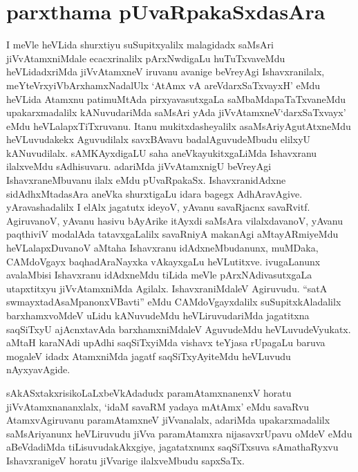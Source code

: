 \section*{parxthama pUvaRpakaSxdasAra}

\begin{artha}
I meVle heVLida shurxtiyu suSupitxyalilx malagidadx saMsAri
jiVvAtamxniMdale  ecacxrinalilx pArxNwdigaLu huTuTxvaveMdu
heVLidadxriMda jiVvAtamxneV iruvanu avanige beVreyAgi Ishavxranilalx,
meYteVrxyiVbArxhamxNadalUlx `AtAmx vA areVdarxSaTxvayxH' eMdu heVLida
Atamxnu patimuMtAda pirxyavasutxgaLa saMbaMdapaTaTxvaneMdu
upakarxmadalilx kANuvudariMda saMsAri yAda jiVvAtamxneV`darxSaTxvayx'
eMdu heVLalapxTiTxruvanu. Itanu mukitxdasheyalilx
asaMsAriyAgutAtxneMdu heVLuvudakekx Aguvudilalx  savxBAvavu
badalAguvudeMbudu elilxyU kANuvudilalx. sAMKAyxdigaLU saha
aneVkayukitxgaLiMda Ishavxranu ilalxveMdu sAdhisuvaru. adariMda
jiVvAtamxnigU beVreyAgi IshavxraneMbuvanu ilalx eMdu
pUvaRpakaSx. IshavxranidAdxne sidAdhxMtadasAra aneVka shurxtigaLu
idara bagegx  AdhAravAgive. yAravashadalilx I elAlx jagatutx ideyoV,
yAvanu savaRjacnx savaRvitf. AgiruvanoV, yAvanu hasivu  bAyArike
itAyxdi saMsAra vilalxdavanoV, yAvanu paqthiviV modalAda
tatavxgaLalilx savaRniyA makanAgi aMtayARmiyeMdu heVLalapxDuvanoV
aMtaha Ishavxranu idAdxneMbudanunx, muMDaka, CAMdoVgayx baqhadAraNayxka
vAkayxgaLu heVLutitxve. ivugaLanunx avalaMbisi Ishavxranu idAdxneMdu
tiLida meVle pArxNAdivasutxgaLa utapxtitxyu jiVvAtamxniMda
Agilalx. IshavxraniMdaleV Agiruvudu. ``satA
swmayxtadAsaMpanonxVBavti'' eMdu CAMdoVgayxdalilx suSupitxkAladalilx
barxhamxvoMdeV uLidu kANuvudeMdu heVLiruvudariMda jagatitxna saqSiTxyU
ajAcnxtavAda barxhamxniMdaleV AguvudeMdu heVLuvudeVyukatx. aMtaH
karaNAdi upAdhi saqSiTxyiMda vishavx teYjasa rUpagaLu baruva mogaleV
idadx AtamxniMda jagatf saqSiTxyAyiteMdu heVLuvudu nAyxyavAgide.
\end{artha}


\begin{artha}
sAkASxtakxrisikoLaLxbeVkAdadudx paramAtamxnanenxV horatu
jiVvAtamxnananxlalx, `idaM savaRM yadaya mAtAmx' eMdu savaRvu
AtamxvAgiruvanu paramAtamxneV jiVvanalalx, adariMda upakarxmadalilx
saMsAriyanunx heVLiruvudu jiVva paramAtamxra nijasavxrUpavu oMdeV eMdu
aBeVdadiMda tiLisuvudakAkxgiye, jagatatxnunx saqSiTxsuva sAmathaRyxvu
IshavxranigeV horatu jiVvarige ilalxveMbudu sapxSaTx.
\end{artha}



